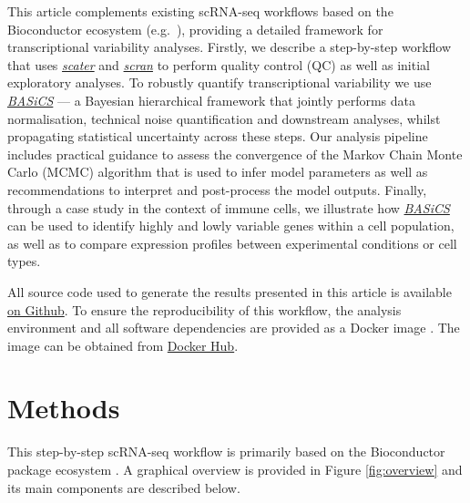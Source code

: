 \documentclass[9pt,a4paper,]{extarticle}
\begin{document}
This article complements existing scRNA-seq workflows based on the Bioconductor
ecosystem (e.g.~\citep{Lun2016, Kim2019}), providing a detailed framework for
transcriptional variability analyses.
Firstly, we describe a step-by-step workflow that uses
\emph{\href{https://bioconductor.org/packages/3.11/scater}{scater}} \citep{McCarthy2017} and \emph{\href{https://bioconductor.org/packages/3.11/scran}{scran}} \citep{Lun2016}
to perform quality control (QC) as well as initial exploratory analyses.
To robustly quantify transcriptional variability we use \emph{\href{https://bioconductor.org/packages/3.11/BASiCS}{BASiCS}}
\citep{Vallejos2015, Vallejos2016, Eling2017} --- a Bayesian hierarchical framework
that jointly performs data normalisation, technical noise quantification and
downstream analyses, whilst propagating statistical uncertainty across these
steps.
Our analysis pipeline includes practical guidance to assess the convergence of
the Markov Chain Monte Carlo (MCMC) algorithm that is used to infer model
parameters as well as recommendations to interpret and post-process the model
outputs.
Finally, through a case study in the context of immune cells, we illustrate
how \emph{\href{https://bioconductor.org/packages/3.11/BASiCS}{BASiCS}} can be used to identify highly and lowly variable
genes within a cell population, as well as to compare expression profiles
between experimental conditions or cell types.

All source code used to generate the results presented in this article is
available \href{https://github.com/VallejosGroup/BASiCSWorkflow}{on Github}.
To ensure the
reproducibility of this workflow, the analysis environment and all software
dependencies are provided as a Docker image \citep{Boettiger2015}. The image
can be obtained from
\href{https://hub.docker.com/repository/docker/alanocallaghan/bocker}{Docker Hub}.

\hypertarget{methods}{%
\section{Methods}\label{methods}}

This step-by-step scRNA-seq workflow is primarily based on the Bioconductor
package ecosystem \citep{Amezquita2019}.
A graphical overview is provided in Figure \ref{fig:overview}
and its main components are described below.
\end{document}
